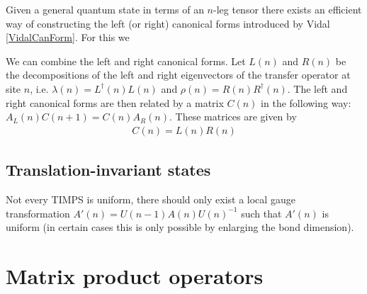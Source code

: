 	\begin{method}[Vidal]
		Given a general quantum state in terms of an $n$-leg tensor there exists an efficient way of constructing the left (or right) canonical forms introduced by Vidal \ref{VidalCanForm}. For this we 
	\end{method}
	
	\begin{construct}
		We can combine the left and right canonical forms. Let $L(n)$ and $R(n)$ be the decompositions of the left and right eigenvectors of the transfer operator at site $n$, i.e. $\lambda(n)=L^\dag(n)L(n)$ and $\rho(n)=R(n)R^\dag(n)$. The left and right canonical forms are then related by a matrix $C(n)$ in the following way: $A_L(n)C(n+1)=C(n)A_R(n)$. These matrices are given by
		\begin{gather}
			C(n)=L(n)R(n)
		\end{gather}
	\end{construct}
	
\subsection{Translation-invariant states}

	\begin{remark}[TIMPS]
		Not every TIMPS is uniform, there should only exist a local gauge transformation $A'(n) = U(n-1)A(n)U(n)^{-1}$ such that $A'(n)$ is uniform (in certain cases this is only possible by enlarging the bond dimension).
	\end{remark}


\section{Matrix product operators}

	
